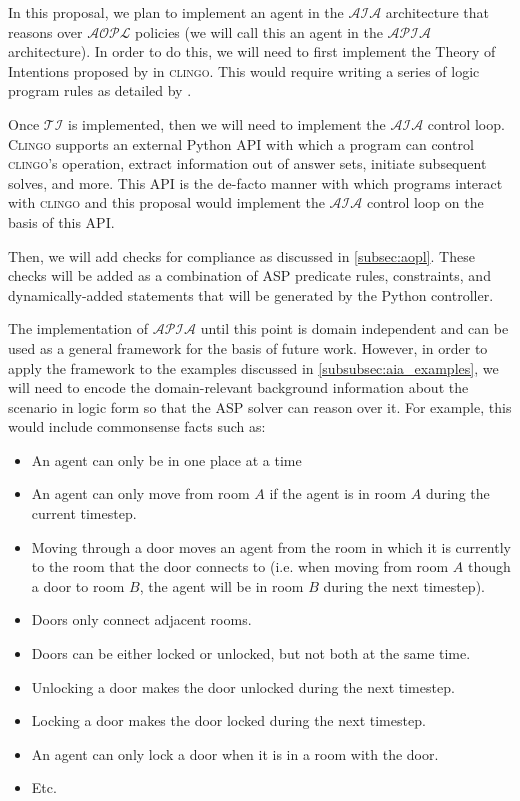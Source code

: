 In this proposal, we plan to implement an agent in the $\mathcal{AIA}$ architecture that reasons over $\mathcal{AOPL}$ policies (we will call this an agent in the $\mathcal{APIA}$ architecture).
In order to do this, we will need to first implement the Theory of Intentions proposed by \citet{blount_towards_2014} in \textsc{clingo}.
This would require writing a series of logic program rules as detailed by \citet{blount_towards_2014}.

Once $\mathcal{TI}$ is implemented, then we will need to implement the $\mathcal{AIA}$ control loop.
\textsc{Clingo} supports an external Python API with which a program can control \textsc{clingo}'s operation, extract information out of answer sets, initiate subsequent solves, and more.
This API is the de-facto manner with which programs interact with \textsc{clingo} and this proposal would implement the $\mathcal{AIA}$ control loop on the basis of this API.

Then, we will add checks for compliance as discussed in \cref{subsec:aopl}.
These checks will be added as a combination of ASP predicate rules, constraints, and dynamically-added statements that will be generated by the Python controller.

The implementation of $\mathcal{APIA}$ until this point is domain independent and can be used as a general framework for the basis of future work.
However, in order to apply the framework to the examples discussed in \cref{subsubsec:aia_examples}, we will need to encode the domain-relevant background information about the scenario in logic form so that the ASP solver can reason over it.
For example, this would include commonsense facts such as:

\begin{itemize}
    \item An agent can only be in one place at a time
    \item An agent can only move from room $A$ if the agent is in room $A$ during the current timestep.
    \item Moving through a door moves an agent from the room in which it is currently to the room that the door connects to (i.e. when moving from room $A$ though a door to room $B$, the agent will be in room $B$ during the next timestep).
    \item Doors only connect adjacent rooms.
    \item Doors can be either locked or unlocked, but not both at the same time.
    \item Unlocking a door makes the door unlocked during the next timestep.
    \item Locking a door makes the door locked during the next timestep.
    \item An agent can only lock a door when it is in a room with the door.
    \item Etc.
\end{itemize}

